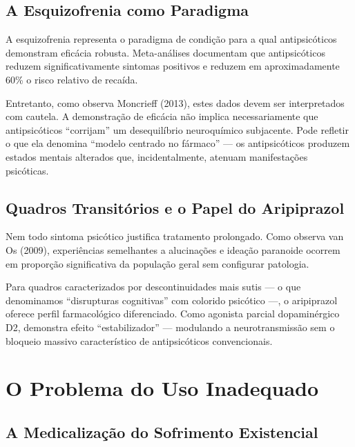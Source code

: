 \subsection{A Esquizofrenia como Paradigma}

A esquizofrenia representa o paradigma de condição para a qual antipsicóticos demonstram eficácia robusta. Meta-análises documentam que antipsicóticos reduzem significativamente sintomas positivos e reduzem em aproximadamente 60\% o risco relativo de recaída.

Entretanto, como observa Moncrieff (2013), estes dados devem ser interpretados com cautela. A demonstração de eficácia não implica necessariamente que antipsicóticos \enquote{corrijam} um desequilíbrio neuroquímico subjacente. Pode refletir o que ela denomina \enquote{modelo centrado no fármaco} --- os antipsicóticos produzem estados mentais alterados que, incidentalmente, atenuam manifestações psicóticas.

\subsection{Quadros Transitórios e o Papel do Aripiprazol}

Nem todo sintoma psicótico justifica tratamento prolongado. Como observa van Os (2009), experiências semelhantes a alucinações e ideação paranoide ocorrem em proporção significativa da população geral sem configurar patologia.

Para quadros caracterizados por descontinuidades mais sutis --- o que denominamos \enquote{disrupturas cognitivas} com colorido psicótico ---, o aripiprazol oferece perfil farmacológico diferenciado. Como agonista parcial dopaminérgico D2, demonstra efeito \enquote{estabilizador} --- modulando a neurotransmissão sem o bloqueio massivo característico de antipsicóticos convencionais.

\section{O Problema do Uso Inadequado}
\label{sec:uso-inadequado}

\subsection{A Medicalização do Sofrimento Existencial}

